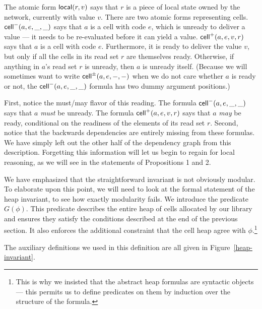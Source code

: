 \documentclass[natbib]{sigplanconf}
\begin{document}
The atomic form $\mbox{\textsf{{local}}}({r}, {v})$ says that $r$ is a piece of local
state owned by the network, currently with value $v$. There are two
atomic forms representing cells. $\mbox{\textsf{{cell}}}^{-}({a}, {e}, {\_}, {\_})$ says that $a$ is a
cell with code $e$, which is unready to deliver a value --- it needs
to be re-evaluated before it can yield a value. $\mbox{\textsf{{cell}}}^{+}({a}, {e}, {v}, {r})$
says that $a$ is a cell with code $e$. Furthermore, it is ready to
deliver the value $v$, but only if all the cells in its read set $r$
are themselves ready. Otherwise, if anything in $a$'s read set $r$ is 
unready, then $a$ is unready itself. (Because we will sometimes want to
write $\mbox{\textsf{{cell}}}^{\pm}({a}, {e}, {-}, {-})$ when we do not care whether $a$ is ready or
not, the $\mbox{\textsf{{cell}}}^{-}({a}, {e}, {\_}, {\_})$ formula has two dummy argument positions.)

First, notice the must/may flavor of this reading. The formula
$\mbox{\textsf{{cell}}}^{-}({a}, {e}, {\_}, {\_})$ says that $a$ \emph{must} be unready.  The formula
$\mbox{\textsf{{cell}}}^{+}({a}, {e}, {v}, {r})$ says that $a$ \emph{may} be ready, conditional
on the readiness of the elements of its read set $r$. Second, notice
that the backwards dependencies are entirely missing from these
formulas. We have simply left out the other half of the dependency
graph from this description. Forgetting this information will let us
begin to regain for local reasoning, as we will see in the statements
of Propositions 1 and 2. 

We have emphasized that the straightforward invariant is not obviously
modular. To elaborate upon this point, we will need to look at the
formal statement of the heap invariant, to see how exactly modularity
fails. We introduce the predicate $G(\phi)$. This predicate describes
the entire heap of cells allocated by our library and ensures they
satisfy the conditions described at the end of the previous
section. It also enforces the additional constraint that the cell heap
agree with $\phi$.\footnote{This is why we insisted that the abstract
  heap formulas are syntactic objects --- this permits us to define
  predicates on them by induction over the structure of the formula.}
The auxiliary definitions we used in this definition are all given in
Figure~\ref{heap-invariant}. 
\end{document}

